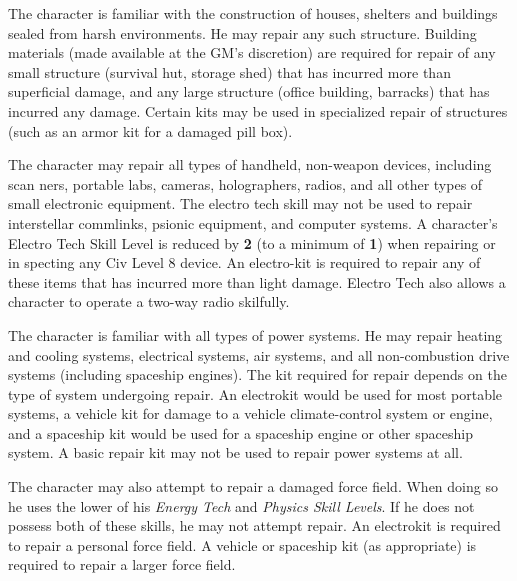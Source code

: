 \label{sec:skill-construction}

The character is familiar with the construction of houses, shelters
and buildings sealed from harsh environments.  He may repair any such
structure.  Building materials (made available at the GM's discretion)
are required for repair of any small structure (survival hut, storage
shed) that has incurred more than superficial damage, and any large
structure (office building, barracks) that has incurred any damage.
Certain kits may be used in specialized repair of structures (such as
an armor kit for a damaged pill box).

\label{sec:skill-electro-tech}

The character may repair all types of handheld, non-weapon devices,
including scan ners, portable labs, cameras, holographers, radios, and
all other types of small electronic equipment.  The electro tech skill
may not be used to repair interstellar commlinks, psionic equipment,
and computer systems.  A character's Electro Tech Skill Level is
reduced by \textbf{2} (to a minimum of \textbf{1}) when repairing or
in specting any Civ Level 8 device.  An electro-kit is required to
repair any of these items that has incurred more than light damage.
Electro Tech also allows a character to operate a two-way radio
skilfully.

\label{sec:skill-energy-tech}

The character is familiar with all types of power systems.  He may
repair heating and cooling systems, electrical systems, air systems,
and all non-combustion drive systems (including spaceship engines).
The kit required for repair depends on the type of system undergoing
repair.  An electrokit would be used for most portable systems, a
vehicle kit for damage to a vehicle climate-control system or engine,
and a spaceship kit would be used for a spaceship engine or other
spaceship system.  A basic repair kit may not be used to repair power
systems at all.  

The character may also attempt to repair a damaged
force field.  When doing so he uses the lower of his \emph{Energy Tech}
and \emph{Physics Skill Levels}.  If he does not possess both of these
skills, he may not attempt repair.  An electrokit is required to repair
a personal force field.  A vehicle or spaceship kit (as appropriate) is
required to repair a larger force field.

